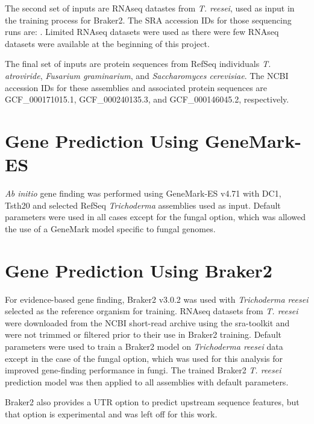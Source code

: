 The second set of inputs are RNAseq datastes from \textit{T. reesei},
used as input in the training process for Braker2. The SRA accession
IDs for those sequencing runs are: . Limited RNAseq datasets were used
as there were few RNAseq datasets were available at the beginning of
this project.

The final set of inputs are protein sequences from RefSeq individuals
\textit{T. atroviride}, \textit{Fusarium graminarium}, and
\textit{Saccharomyces cerevisiae}. The NCBI accession IDs for these
assemblies and associated protein sequences are GCF\_000171015.1,
GCF\_000240135.3, and GCF\_000146045.2, respectively.

\section{Gene Prediction Using GeneMark-ES}
\label{met:genemark}

\textit{Ab initio} gene finding was performed using GeneMark-ES
v4.71\cite{Borodovsky2011} with DC1, Tsth20 and selected RefSeq
\textit{Trichoderma} assemblies used as input. Default parameters were
used in all cases except for the fungal option, which was allowed the
use of a GeneMark model specific to fungal genomes.

%

\section{Gene Prediction Using Braker2}
\label{met:braker2}

For evidence-based gene finding, Braker2 v3.0.2\cite{Bruna2021} was
used with \textit{Trichoderma reesei} selected as the reference
organism for training. RNAseq datasets from \textit{T. reesei} were
downloaded from the NCBI short-read archive using the
sra-toolkit\cite{NCBI2025} and were not trimmed or filtered prior to
their use in Braker2 training. Default parameters were used to train a
Braker2 model on \textit{Trichoderma reesei} data except in the case
of the fungal option, which was used for this analysis for improved
gene-finding performance in fungi. The trained Braker2
\textit{T. reesei} prediction model was then applied to all assemblies
with default parameters.

Braker2 also provides a UTR option to predict upstream sequence
features, but that option is experimental and was left off for this
work.

